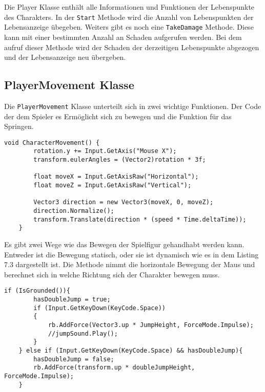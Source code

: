 Die Player Klasse enthält alle Informationen und Funktionen der Lebenspunkte des Charakters. In der \verb+Start+ Methode wird die Anzahl von Lebenspunkten der Lebensanzeige übegeben. Weiters gibt es noch eine \verb+TakeDamage+ Methode. Diese kann mit einer bestimmten Anzahl an Schaden aufgerufen werden. Bei dem aufruf dieser Methode wird der Schaden der derzeitigen Lebenspunkte abgezogen und der Lebensanzeige neu übergeben. 

\pagebreak
\subsection{PlayerMovement Klasse}
Die \verb+PlayerMovement+ Klasse unterteilt sich in zwei wichtige Funktionen. Der Code der dem Spieler es Ermöglicht sich zu bewegen und die Funktion für das Springen.\\

\begin{lstlisting}[language=CSharp,caption={CharacterMovement},label=code:charactermovement]
    void CharacterMovement() {
        rotation.y += Input.GetAxis("Mouse X");
        transform.eulerAngles = (Vector2)rotation * 3f;
        
        float moveX = Input.GetAxisRaw("Horizontal");
        float moveZ = Input.GetAxisRaw("Vertical");
    
        Vector3 direction = new Vector3(moveX, 0, moveZ);
        direction.Normalize();
        transform.Translate(direction * (speed * Time.deltaTime));
    }
\end{lstlisting}

Es gibt zwei Wege wie das Bewegen der Spielfigur gehandhabt werden kann. Entweder ist die Bewegung statisch, oder sie ist dynamisch wie es in dem Listing 7.3 dargestellt ist. Die Methode nimmt die horizontale Bewegung der Maus und berechnet sich in welche Richtung sich der Charakter bewegen muss.\\

\begin{lstlisting}[language=CSharp,caption={Jump \& DoubleJump der PlayerMovement Klasse.},label=code:player]
    if (IsGrounded()){
        hasDoubleJump = true;
        if (Input.GetKeyDown(KeyCode.Space))
        {
            rb.AddForce(Vector3.up * JumpHeight, ForceMode.Impulse);
            //jumpSound.Play();
        }
    } else if (Input.GetKeyDown(KeyCode.Space) && hasDoubleJump){
        hasDoubleJump = false;
        rb.AddForce(transform.up * doubleJumpHeight, ForceMode.Impulse);
    }
\end{lstlisting}

